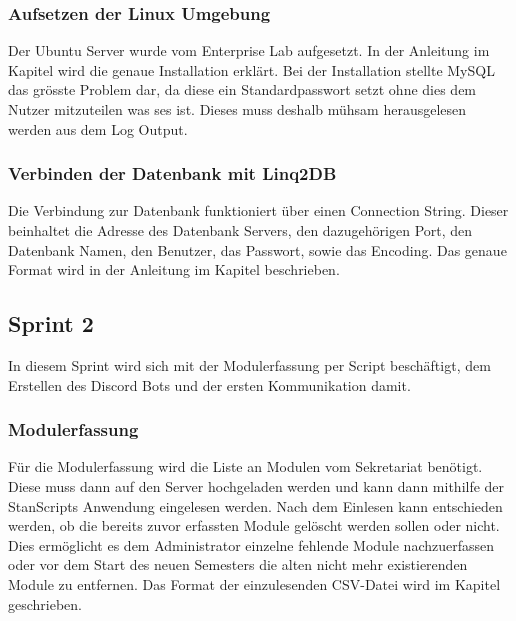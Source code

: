 \documentclass[a4paper, table]{article}
\begin{document}
\subsubsection{Aufsetzen der Linux Umgebung}

Der Ubuntu Server wurde vom Enterprise Lab aufgesetzt.
In der Anleitung im Kapitel  wird die genaue Installation erklärt.
Bei der Installation stellte MySQL das grösste Problem dar, da diese ein Standardpasswort setzt ohne dies dem Nutzer mitzuteilen was ses ist.
Dieses muss deshalb mühsam herausgelesen werden aus dem Log Output.

\subsubsection{Verbinden der Datenbank mit Linq2DB}

Die Verbindung zur Datenbank funktioniert über einen Connection String.
Dieser beinhaltet die Adresse des Datenbank Servers, den dazugehörigen Port, den Datenbank Namen, den Benutzer, das Passwort, sowie das Encoding.
Das genaue Format wird in der Anleitung im Kapitel  beschrieben.

\newpage
\subsection{Sprint 2}
In diesem Sprint wird sich mit der Modulerfassung per Script beschäftigt,
dem Erstellen des Discord Bots und der ersten Kommunikation damit.

\subsubsection{Modulerfassung}

Für die Modulerfassung wird die Liste an Modulen vom Sekretariat benötigt.
Diese muss dann auf den Server hochgeladen werden und kann dann mithilfe der StanScripts Anwendung eingelesen werden.
Nach dem Einlesen kann entschieden werden, ob die bereits zuvor erfassten Module gelöscht werden sollen oder nicht.
Dies ermöglicht es dem Administrator einzelne fehlende Module nachzuerfassen oder vor dem Start des neuen Semesters die alten nicht mehr existierenden Module zu entfernen.
Das Format der einzulesenden CSV-Datei wird im Kapitel  geschrieben.
\end{document}
